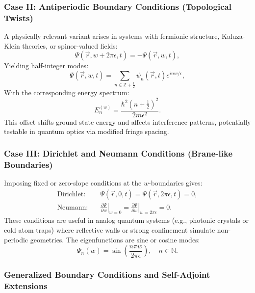 \documentclass[12pt]{article}
\begin{document}
\subsubsection*{Case II: Antiperiodic Boundary Conditions (Topological Twists)}

A physically relevant variant arises in systems with fermionic structure, Kaluza-Klein theories, or spinor-valued fields:
\begin{equation}
\Psi(\vec{r}, w + 2\pi\epsilon, t) = -\Psi(\vec{r}, w, t),
\label{eq:antiperiodic_bc}
\end{equation}
Yielding half-integer modes:
\begin{equation}
\Psi(\vec{r}, w, t) = \sum_{n \in \mathbb{Z} + \frac{1}{2}} \psi_n(\vec{r}, t) e^{i n w / \epsilon},
\end{equation}
With the corresponding energy spectrum:
\begin{equation}
E_n^{(w)} = \frac{\hbar^2 (n + \tfrac{1}{2})^2}{2m \epsilon^2}.
\end{equation}
This offset shifts ground state energy and affects interference patterns, potentially testable in quantum optics via modified fringe spacing.

\subsubsection*{Case III: Dirichlet and Neumann Conditions (Brane-like Boundaries)}

Imposing fixed or zero-slope conditions at the \(w\)-boundaries gives:
\begin{align}
\text{Dirichlet:} \quad & \Psi(\vec{r}, 0, t) = \Psi(\vec{r}, 2\pi\epsilon, t) = 0, \label{eq:dirichlet_bc} \\
\text{Neumann:} \quad & \left.\frac{\partial \Psi}{\partial w}\right|_{w = 0} = \left.\frac{\partial \Psi}{\partial w}\right|_{w = 2\pi\epsilon} = 0.
\label{eq:neumann_bc}
\end{align}
These conditions are useful in analog quantum systems (e.g., photonic crystals or cold atom traps) where reflective walls or strong confinement simulate non-periodic geometries. The eigenfunctions are sine or cosine modes:
\begin{equation}
\Psi_n(w) = \sin\left(\frac{n\pi w}{2\pi\epsilon} \right), \quad n \in \mathbb{N}.
\end{equation}

\subsubsection*{Generalized Boundary Conditions and Self-Adjoint Extensions}
\end{document}
